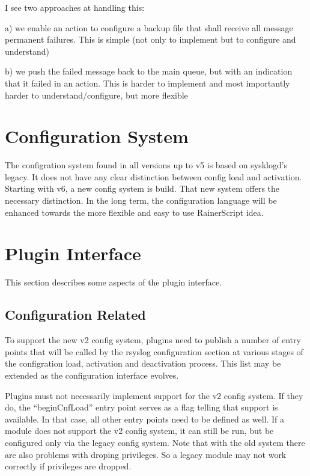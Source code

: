 \documentclass[a4paper,10pt]{article}
\begin{document}
I see two approaches at handling this:

a) we enable an action to configure a backup file that shall receive all
message permanent failures. This is simple (not only to implement but to
configure and understand)

b) we push the failed message back to the main queue, but with an indication
that it failed in an action. This is harder to implement and most importantly
harder to understand/configure, but more flexible

\section{Configuration System}
The configration system found in all versions up to v5 is based on sysklogd's
legacy. It does not have any clear distinction between config load and
activation. Starting with v6, a new config system is build. That new system
offers the necessary distinction. In the long term, the configuration language
will be enhanced towards the more flexible and easy to use RainerScript idea.

\section{Plugin Interface}
This section describes some aspects of the plugin interface.
\subsection{Configuration Related}
To support the new v2 config system, plugins need to publish a number of entry
points that will be called by the rsyslog configuration section at various
stages of the configration load, activation and deactivation process. This list
may be extended as the configuration interface evolves.

Plugins must not necessarily implement support for the v2 config system. If
they do, the ``beginCnfLoad'' entry point serves as a flag telling that support
is available. In that case, all other entry points need to be defined as well.
If a module does not support the v2 config system, it can still be run, but be
configured only via the legacy config system. Note that with the old system
there are also problems with droping privileges. So a legacy module may not
work correctly if privileges are dropped.
\end{document}
